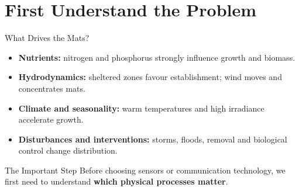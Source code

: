 \part[nopartpage]{First Understand the Problem}

\begin{frame}{What Drives the Mats?}
\begin{itemize}
    \item \textbf{Nutrients:} nitrogen and phosphorus strongly influence growth and biomass.
    \item \textbf{Hydrodynamics:} sheltered zones favour establishment; wind moves and concentrates mats.
    \item \textbf{Climate and seasonality:} warm temperatures and high irradiance accelerate growth.
    \item \textbf{Disturbances and interventions:} storms, floods, removal and biological control change distribution.
\end{itemize}
\begin{block}{The Important Step}
Before choosing sensors or communication technology, we first need to understand \textbf{which physical processes matter}.
\end{block}
\end{frame}
